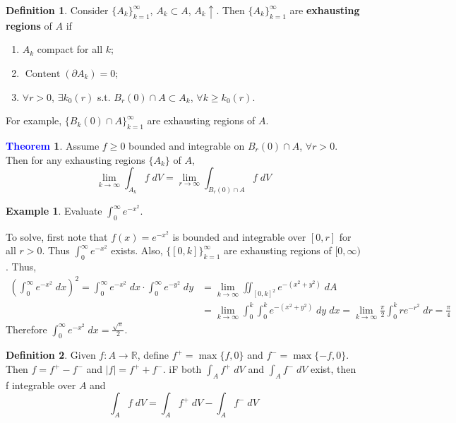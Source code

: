 \documentclass[11pt]{article}
\theoremstyle{definition}
\newtheorem{exmp}{Example}[section]
\theoremstyle{definition}
\newcommand{\R}[0]{\mathbb{R}}
\DeclareMathOperator{\Content}{Content}
\newtheorem{theorem}{\textcolor{blue}{Theorem}}
\theoremstyle{definition}
\newtheorem{definition}{\textcolor{OliveGreen}{Definition}}
\theoremstyle{remark}
\begin{document}
\begin{definition}
    Consider $\{A_k\}_{k = 1}^\infty$, $A_k \subset A$, $A_k \uparrow$. Then $\{A_k\}_{k =1}^\infty$ are
    \textbf{exhausting regions} of $A$ if 
    \begin{enumerate}
        \item $A_k$ compact for all $k$;
        \item $\Content(\partial A_k) = 0$;
        \item $\forall r > 0$, $\exists k_0(r)$ s.t. $B_r(0) \cap A \subset A_k$, $\forall k \geq k_0(r)$.     
    \end{enumerate} 

    For example, $\{B_k(0) \cap A\}_{k = 1}^\infty$ are exhausting regions of $A$.
\end{definition}

\begin{theorem}
    Assume $f \geq 0$ bounded and integrable on $B_r(0) \cap A$, $\forall r > 0$. Then for any exhausting regions
    $\{A_k\}$ of $A$, 
    \[
        \lim_{k \to \infty} \int_{A_k} f \; dV = \lim_{r \to \infty} \int_{B_r(0) \cap A} f \; dV
    \]      
\end{theorem}

\begin{exmp}
    Evaluate $\int_0^\infty e^{-x^2}$.
    
    To solve, first note that $f(x) = e^{-x^2}$ is bounded and integrable over $[0, r]$ for all $r > 0$. Thus $\int_0^\infty e^{-x^2}$ exists. 
    Also, $\{[0, k]\}_{k = 1}^\infty$ are exhausting regions of $[0, \infty)$. Thus,
    \begin{align*}
        \left(\int_0^\infty e^{-x^2} \; dx \right)^2 = \int_0^\infty e^{-x^2} \; dx \cdot \int_0^\infty e^{-y^2} \; dy &= \lim_{k \to \infty} \iint_{[0, k]^2} e^{-(x^2 + y^2)} \; dA \\
        &= \lim_{k \to \infty} \int_0^k \int_0^k e^{-(x^2 + y^2)} \; dy \; dx = \lim_{k \to \infty} \frac{\pi}{2} \int_0^k r e^{-r^2} \; dr = \frac{\pi}{4}
    \end{align*}
    Therefore $\int_0^\infty e^{-x^2} \; dx = \frac{\sqrt{\pi}}{2}$.
\end{exmp}

\begin{definition}
    Given $f : A \to \R$, define $f^+ = \max\{f, 0\}$ and $f^- = \max\{-f, 0\}$. Then $f = f^+ - f^-$ and $|f| = f^+ + f^-$. 
    iF both $\int_A f^+ \; dV$ and $\int_A f^- \; dV$ exist, then f integrable over $A$ and 
    \[
        \int_{A} f \; dV = \int_A f^+ \; dV - \int_A f^- \; dV
    \] 
\end{definition}
\end{document}
